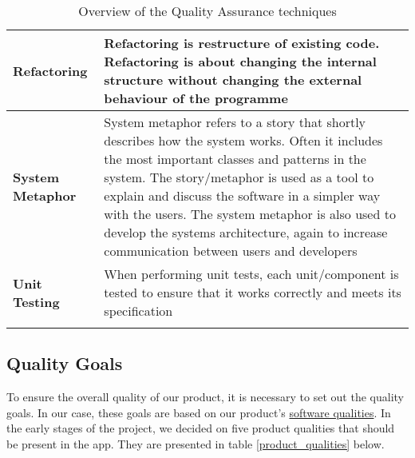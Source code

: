 \begin{longtable}[c]{@{}p{}p{}@{}}
\textbf{Refactoring }                             & Refactoring is restructure of existing code. Refactoring is about changing the internal structure without changing the external behaviour of the programme \cite[p.4]{Hou}                                                                                                                                                                                                                                           \\* \midrule
\textbf{System Metaphor }                         & System metaphor refers to a story that shortly describes how the system works. Often it includes the most important classes and patterns in the system. The story/metaphor is used as a tool to explain and discuss the software in a simpler way with the users. The system metaphor is also used to develop the systems architecture, again to increase communication between users and developers \cite[p.4]{Hou} \\ \midrule
\textbf{Unit Testing }                            & When performing unit tests, each unit/component is tested to ensure that it works correctly and meets its specification \cite[p.232]{Sommerville}                                                                                                                                                                                                                                                                            \\* \bottomrule
\caption{Overview of the Quality Assurance techniques}
\label{qa_techniques}
\end{longtable}

\subsection {Quality Goals}
To ensure the overall quality of our product, it is necessary to set out the quality goals. In our case, these goals are based on our product’s  \hyperref[Software Qualities]{software qualities}. In the early stages of the project, we decided on five product qualities that should be present in the app. They are presented in table \ref{product_qualities} below.

